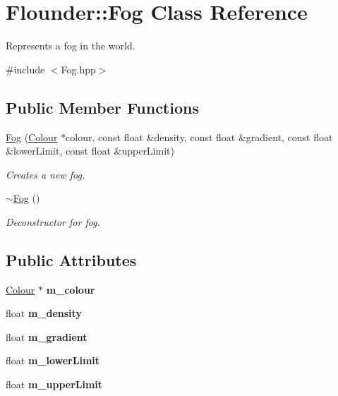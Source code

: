\hypertarget{class_flounder_1_1_fog}{}\section{Flounder\+:\+:Fog Class Reference}
\label{class_flounder_1_1_fog}


Represents a fog in the world.  




{\ttfamily \#include $<$Fog.\+hpp$>$}

\subsection*{Public Member Functions}
\begin{DoxyCompactItemize}
\item 
\hyperlink{class_flounder_1_1_fog_abfc36d1cb177ce425e8507fed00afef2}{Fog} (\hyperlink{class_flounder_1_1_colour}{Colour} $\ast$colour, const float \&density, const float \&gradient, const float \&lower\+Limit, const float \&upper\+Limit)
\begin{DoxyCompactList}\small\item\em Creates a new fog. \end{DoxyCompactList}\item 
\hyperlink{class_flounder_1_1_fog_a92650b45c37d467c3dbc108e6517ea9e}{$\sim$\+Fog} ()
\begin{DoxyCompactList}\small\item\em Deconstructor for fog. \end{DoxyCompactList}\end{DoxyCompactItemize}
\subsection*{Public Attributes}
\begin{DoxyCompactItemize}
\item 
\mbox{\label{class_flounder_1_1_fog_a7b682c22a5c3bcf8f303087ccbd53e7e}} 
\hyperlink{class_flounder_1_1_colour}{Colour} $\ast$ {\bfseries m\+\_\+colour}
\item 
\mbox{\label{class_flounder_1_1_fog_a5f196971e3567a2d3f7ef89c3cfd5a88}} 
float {\bfseries m\+\_\+density}
\item 
\mbox{\label{class_flounder_1_1_fog_aec0954788e85d5c1b0cf17dcdf8c102c}} 
float {\bfseries m\+\_\+gradient}
\item 
\mbox{\label{class_flounder_1_1_fog_a202211fdb3492ccfb3428210487a7db6}} 
float {\bfseries m\+\_\+lower\+Limit}
\item 
\mbox{\label{class_flounder_1_1_fog_a4f617c7d5618f9d3cfe3231ff53e009e}} 
float {\bfseries m\+\_\+upper\+Limit}
\end{DoxyCompactItemize}


